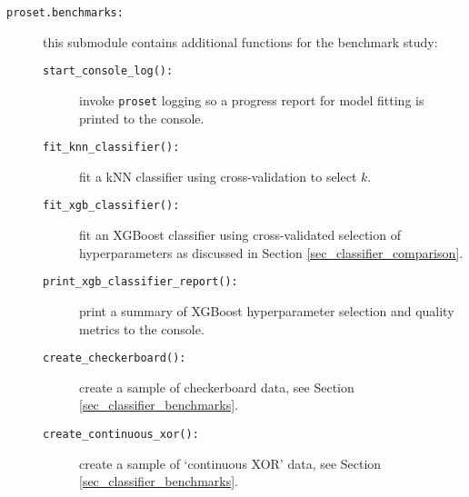 \begin{description}
\begin{description}
\end{description}
%
\item[\texttt{proset.benchmarks:}] this submodule contains additional functions for the benchmark study:
%
\begin{description}
\item[\texttt{start\_console\_log():}] invoke \texttt{proset} logging so a progress report for model fitting is printed to the console.
%
\item[\texttt{fit\_knn\_classifier():}] fit a kNN classifier using cross-validation to select $k$.
%
\item[\texttt{fit\_xgb\_classifier():}] fit an XGBoost classifier using cross-validated selection of hyperparameters as discussed in Section \ref{sec_classifier_comparison}.
%
\item[\texttt{print\_xgb\_classifier\_report():}] print a summary of XGBoost hyperparameter selection and quality metrics to the console.
%
\item[\texttt{create\_checkerboard():}] create a sample of checkerboard data, see Section \ref{sec_classifier_benchmarks}.
%
\item[\texttt{create\_continuous\_xor():}] create a sample of `continuous XOR' data, see Section \ref{sec_classifier_benchmarks}.
\end{description}
\end{description}
%
